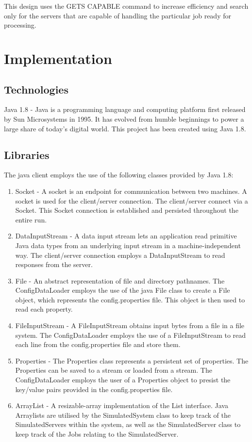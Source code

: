 \documentclass[a4paper]{article}
\begin{document}
This design uses the GETS CAPABLE command to increase efficiency and search only for the servers that are capable of handling the particular job ready for processing. 


\section{Implementation}
\label{sec:section4}
\subsection{Technologies}
Java 1.8 - Java is a programming language and computing platform first released by Sun Microsystems in 1995. It has evolved from humble beginnings to power a large share of today’s digital world. This project has been created using Java 1.8.

\subsection{Libraries}
The java client employs the use of the following classes provided by Java 1.8:
\begin{enumerate}
  \item Socket - A socket is an endpoint for communication between two machines. A socket is used for the client/server connection. The client/server connect via a Socket. This Socket connection is established and persisted throughout the entire run.
  \item DataInputStream - A data input stream lets an application read primitive Java data types from an underlying input stream in a machine-independent way. The client/server connection employs a DataInputStream to read responses from the server.
  \item File - An abstract representation of file and directory pathnames. The ConfigDataLoader employs the use of the java File class to create a File object, which represents the config.properties file. This object is then used to read each property.
  \item FileInputStream - A FileInputStream obtains input bytes from a file in a file system. The ConfigDataLoader employs the use of a FileInputStream to read each line from the config.properties file and store them.
  \item Properties - The Properties class represents a persistent set of properties. The Properties can be saved to a stream or loaded from a stream. The ConfigDataLoader employs the user of a Properties object to presist the key/value pairs provided in the config.properties file.
  \item ArrayList - A resizable-array implementation of the List interface. Java Arraylists are utilised by the SimulatedSystem class to keep track of the SimulatedServers within the system, as well as the SimulatedServer class to keep track of the Jobs relating to the SimulatedServer.
\end{enumerate}
\end{document}

